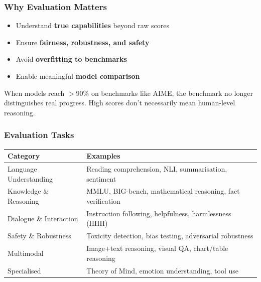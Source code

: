 \bigseparator


\subsubsection{Why Evaluation Matters}

\begin{defbox}
\begin{itemize}
  \item Understand \textbf{true capabilities} beyond raw scores
  \item Ensure \textbf{fairness, robustness, and safety}
  \item Avoid \textbf{overfitting to benchmarks}
  \item Enable meaningful \textbf{model comparison}
\end{itemize}
\end{defbox}

\begin{tipbox}
When models reach $>90\%$ on benchmarks like AIME, the benchmark no longer distinguishes real progress. High scores don't necessarily mean human-level reasoning.
\end{tipbox}

\bigseparator

\subsubsection{Evaluation Tasks}

\begin{center}
\renewcommand{\arraystretch}{1.3}
\begin{tabular}{@{} l p{7cm} @{}}
\toprule
\textbf{Category} & \textbf{Examples} \\
\midrule
Language Understanding & Reading comprehension, NLI, summarisation, sentiment \\
Knowledge \& Reasoning & MMLU, BIG-bench, mathematical reasoning, fact verification \\
Dialogue \& Interaction & Instruction following, helpfulness, harmlessness (HHH) \\
Safety \& Robustness & Toxicity detection, bias testing, adversarial robustness \\
Multimodal & Image+text reasoning, visual QA, chart/table reasoning \\
Specialised & Theory of Mind, emotion understanding, tool use \\
\bottomrule
\end{tabular}
\end{center}

